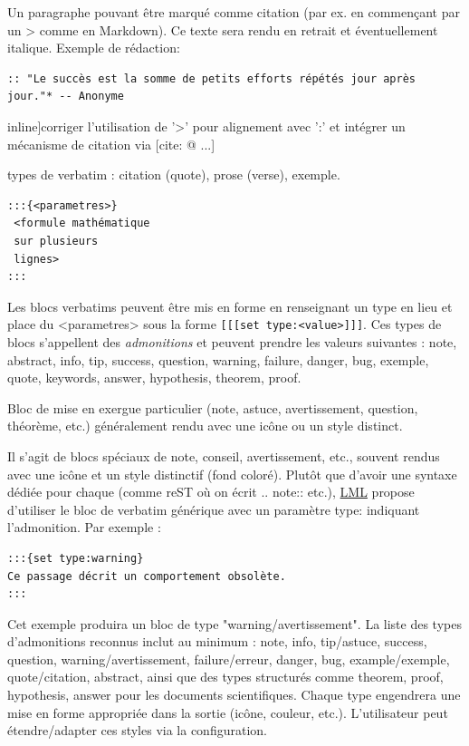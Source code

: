\documentclass[a4paper,12pt]{article}
\def\todo#1{}%
\begin{document}
Un paragraphe pouvant être marqué comme citation (par ex. en commençant par un > comme en Markdown). Ce texte sera rendu en retrait et éventuellement italique. Exemple de rédaction:
\begin{verbatim}
:: "Le succès est la somme de petits efforts répétés jour après jour."* -- Anonyme
\end{verbatim}
\todo[inline]{corriger l'utilisation de '>' pour alignement avec ':' et intégrer un mécanisme de citation via [cite: @ ...]}

types de verbatim : citation (quote), prose (verse), exemple.

\begin{verbatim}
:::{<parametres>}
 <formule mathématique
 sur plusieurs
 lignes>
:::
\end{verbatim}

Les blocs verbatims peuvent être mis en forme en renseignant un type en lieu et place du <parametres> sous la forme \texttt{[[[set type:<value>]]]}. Ces types de blocs s'appellent des \emph{admonitions}\autocite{donathAdmonitionsMaterialMkDocs} et peuvent prendre les valeurs suivantes : note, abstract, info, tip, success, question, warning, failure, danger, bug, exemple, quote, keywords, answer, hypothesis, theorem, proof.

Bloc de mise en exergue particulier (note, astuce, avertissement, question, théorème, etc.) généralement rendu avec une icône ou un style distinct.

Il s’agit de blocs spéciaux de note, conseil, avertissement, etc., souvent rendus avec une icône et un style distinctif (fond coloré). Plutôt que d’avoir une syntaxe dédiée pour chaque (comme reST où on écrit .. note:: etc.), \protect\hyperlink{gls-2}{\label{gls-2-use-11}LML} propose d’utiliser le bloc de verbatim générique avec un paramètre type: indiquant l’admonition. Par exemple :
\begin{verbatim}
:::{set type:warning}
Ce passage décrit un comportement obsolète.
:::
\end{verbatim}

Cet exemple produira un bloc de type "warning/avertissement". La liste des types d’admonitions reconnus inclut au minimum : note, info, tip/astuce, success, question, warning/avertissement, failure/erreur, danger, bug, example/exemple, quote/citation, abstract, ainsi que des types structurés comme theorem, proof, hypothesis, answer pour les documents scientifiques. Chaque type engendrera une mise en forme appropriée dans la sortie (icône, couleur, etc.). L’utilisateur peut étendre/adapter ces styles via la configuration.
\end{document}
